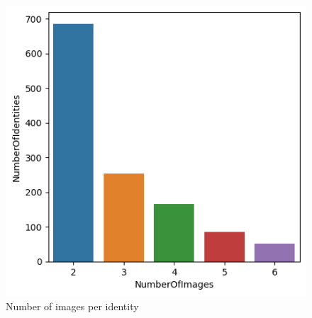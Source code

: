 \documentclass[conference]{IEEEtran}
\begin{document}
\begin{figure}[hbt!]
    \centering
    \includegraphics[height=0.8\linewidth]{latex/images/DistributionOfNumberOfImages.png}
    \caption{Number of images per identity}
    \label{num_img_per_identity}
\end{figure}
\end{document}
